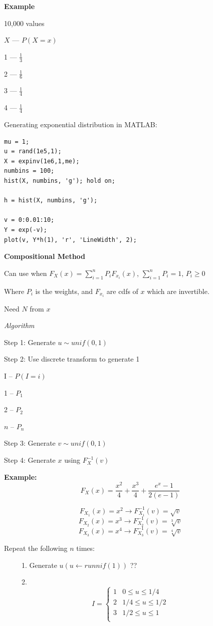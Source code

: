 \documentclass{report}
\begin{document}
\textbf{Example}

10,000 values

$X$ --- $P(X=x)$


1 --- $\frac{1}{3}$

2 --- $\frac{1}{6}$

3 --- $\frac{1}{4}$

4 --- $\frac{1}{4}$

Generating exponential distribution in MATLAB:
\begin{verbatim}
mu = 1;
u = rand(1e5,1);
X = expinv(1e6,1,me);
numbins = 100;
hist(X, numbins, 'g'); hold on;

h = hist(X, numbins, 'g');

v = 0:0.01:10;
Y = exp(-v);
plot(v, Y*h(1), 'r', 'LineWidth', 2);
\end{verbatim}


\textbf{Compositional Method}

Can use when $F_X(x) = \sum_{i=1}^n P_i F_{x_i} (x)$, $\sum_{i=1}^n P_i = 1$, $P_i \geq 0$

Where $P_i$ is the weights, and $F_{x_i}$ are cdfs of $x$ which are invertible.

Need $N$ from $x$

\textit{Algorithm}

Step 1: Generate $u \sim unif(0,1)$

Step 2: Use discrete transform to generate 1

I -- $P(I=i)$

1 -- $P_1$

2 -- $P_2$

$n$ -- $P_n$

Step 3: Generate $v \sim unif(0,1)$ 

Step 4: Generate $x$ using $F_X^{-1}(v)$

\textbf{Example:} $$F_X(x) = \frac{x^2}{4} + \frac{x^3}{4} + \frac{e^x -1}{2(e-1)}$$

$$F_{X_1}(x) = x^2 \rightarrow F_{X_1}^{-1}(v) = \sqrt{v}$$ 
$$F_{X_2}(x) = x^3 \rightarrow F_{X_2}^{-1}(v) = \sqrt[3]{v}$$ 
$$F_{X_3}(x) = x^4 \rightarrow F_{X_3}^{-1}(v) = \sqrt[4]{v}$$ 

Repeat the following $n$ times: 

\ \ \ \ \ 1. Generate $u (u \leftarrow runnif(1)) $ ??

\ \ \ \ \ 2. $$I = \begin{cases} 1 & 0 \leq u \leq 1/4 \\
2 & 1/4 \leq u \leq 1/2 \\
3 & 1/2 \leq u \leq 1 \\
 \end{cases}$$
 
\end{document}
